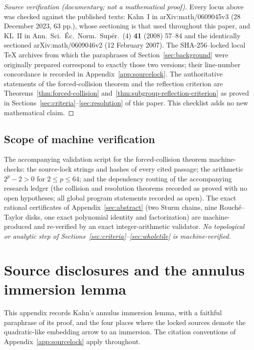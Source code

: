 \documentclass[11pt,reqno]{amsart}
\theoremstyle{definition}
\theoremstyle{remark}
\begin{document}
\begin{proof}[Source verification (documentary; not a mathematical proof)]
Every locus above was checked against the published texts: Kahn~I in
arXiv:math/0609045v3 (28 December 2023, 63 pp.), whose sectioning is
that used throughout this paper, and KL~II in
Ann.\ Sci.\ \'Ec.\ Norm.\ Sup\'er.\ (4) \textbf{41} (2008) 57--84 and
the identically sectioned arXiv:math/0609046v2 (12 February 2007).
The SHA-256--locked local \TeX{} archives from which the paraphrases of
Section~\ref{sec:background} were originally prepared correspond to
exactly those two versions; their line-number concordance is recorded
in Appendix~\ref{app:sourcelock}.  The authoritative statements of the
forced-collision theorem and the reflection criterion are
Theorems~\ref{thm:forced-collision}
and~\ref{thm:subgroup-reflection-criterion} as proved in
Sections~\ref{sec:criteria}--\ref{sec:resolution} of this paper.  This
checklist adds no new mathematical claim.
\end{proof}

\subsection*{Scope of machine verification}
The accompanying validation script for the forced-collision theorem
machine-checks: the source-lock strings and hashes of every cited
passage; the arithmetic $2^{p}-2>0$ for $2\le p\le64$; and the
dependency routing of the accompanying research ledger (the collision
and resolution theorems recorded as proved with no open hypotheses;
all global program statements recorded as open).  The exact rational
certificates of Appendix~\ref{sec:abstract} (two Sturm chains, nine
Rouch\'e--Taylor disks, one exact polynomial identity and
factorization) are machine-produced and re-verified by an exact
integer-arithmetic validator.  \emph{No topological or analytic step
of Sections~\ref{sec:criteria}--\ref{sec:wholetile} is
machine-verified.}

\appendix

\section{Source disclosures and the annulus immersion lemma}
\label{sec:disclosures}

This appendix records Kahn's annulus immersion lemma, with a faithful
paraphrase of its proof, and the four places where the locked sources
demote the quadratic-like embedding arrow to an immersion.  The
citation conventions of Appendix~\ref{app:sourcelock} apply throughout.
\end{document}
